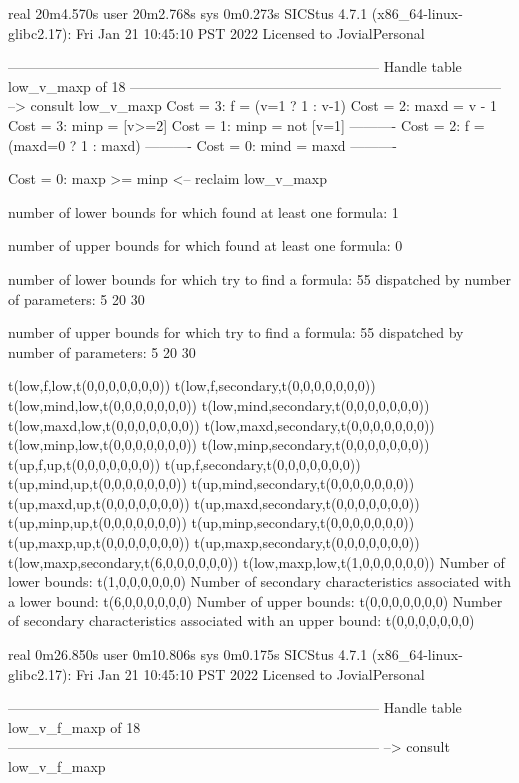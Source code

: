 real	20m4.570s
user	20m2.768s
sys	0m0.273s
SICStus 4.7.1 (x86_64-linux-glibc2.17): Fri Jan 21 10:45:10 PST 2022
Licensed to JovialPersonal


--------------------------------------------------------------------------------
Handle table low_v_maxp of 18
--------------------------------------------------------------------------------
--> consult low_v_maxp
Cost =  3:  f    = (v=1 ? 1 : v-1)
Cost =  2:  maxd = v - 1
Cost =  3:  minp = [v>=2]
Cost =  1:  minp = not [v=1]
----------
Cost =  2:  f    = (maxd=0 ? 1 : maxd)
----------
Cost =  0:  mind = maxd
----------

Cost =  0:  maxp >= minp
<-- reclaim low_v_maxp

number of lower bounds for which found at least one formula: 1

number of upper bounds for which found at least one formula: 0

number of lower bounds for which try to find a formula: 55
dispatched by number of parameters: 5  20  30

number of upper bounds for which try to find a formula: 55
dispatched by number of parameters: 5  20  30

t(low,f,low,t(0,0,0,0,0,0,0))
t(low,f,secondary,t(0,0,0,0,0,0,0))
t(low,mind,low,t(0,0,0,0,0,0,0))
t(low,mind,secondary,t(0,0,0,0,0,0,0))
t(low,maxd,low,t(0,0,0,0,0,0,0))
t(low,maxd,secondary,t(0,0,0,0,0,0,0))
t(low,minp,low,t(0,0,0,0,0,0,0))
t(low,minp,secondary,t(0,0,0,0,0,0,0))
t(up,f,up,t(0,0,0,0,0,0,0))
t(up,f,secondary,t(0,0,0,0,0,0,0))
t(up,mind,up,t(0,0,0,0,0,0,0))
t(up,mind,secondary,t(0,0,0,0,0,0,0))
t(up,maxd,up,t(0,0,0,0,0,0,0))
t(up,maxd,secondary,t(0,0,0,0,0,0,0))
t(up,minp,up,t(0,0,0,0,0,0,0))
t(up,minp,secondary,t(0,0,0,0,0,0,0))
t(up,maxp,up,t(0,0,0,0,0,0,0))
t(up,maxp,secondary,t(0,0,0,0,0,0,0))
t(low,maxp,secondary,t(6,0,0,0,0,0,0))
t(low,maxp,low,t(1,0,0,0,0,0,0))
Number of lower bounds:                                             t(1,0,0,0,0,0,0)
Number of secondary characteristics associated with a lower bound:  t(6,0,0,0,0,0,0)
Number of upper bounds:                                             t(0,0,0,0,0,0,0)
Number of secondary characteristics associated with an upper bound: t(0,0,0,0,0,0,0)

real	0m26.850s
user	0m10.806s
sys	0m0.175s
SICStus 4.7.1 (x86_64-linux-glibc2.17): Fri Jan 21 10:45:10 PST 2022
Licensed to JovialPersonal


--------------------------------------------------------------------------------
Handle table low_v_f_maxp of 18
--------------------------------------------------------------------------------
--> consult low_v_f_maxp

